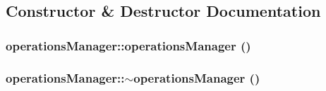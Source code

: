 \subsection{Constructor \& Destructor Documentation}
\hypertarget{classoperations_manager_aed9d480402e7e7643e96e08563c2490d}{
\subsubsection[{operationsManager}]{\setlength{\rightskip}{0pt plus 5cm}operationsManager::operationsManager ()}}
\label{classoperations_manager_aed9d480402e7e7643e96e08563c2490d}
\hypertarget{classoperations_manager_a9aae04376cecc0fa7a13cadcde8cb2b5}{
\subsubsection[{$\sim$operationsManager}]{\setlength{\rightskip}{0pt plus 5cm}operationsManager::$\sim$operationsManager ()}}
\label{classoperations_manager_a9aae04376cecc0fa7a13cadcde8cb2b5}


